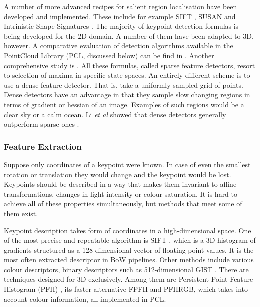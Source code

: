\documentclass[11pt,twoside]{article}
\begin{document}
    A number of more advanced recipes for salient region localisation have been developed and implemented. These include for example SIFT \cite{sift_keypoint}, SUSAN \cite{susan_keypoint} and Intrinistic Shape Signatures \cite{iss_keypoint}. The majority of keypoint detection formulas is being developed for the 2D domain. A number of them have been adapted to 3D, however. A comparative evaluation of detection algorithms available in the PointCloud Library (PCL, discussed below) can be find in \cite{pcl_keypoint_comparision}. Another comprehensive study is \cite{3d_keypoint_eval}. All these formulas, called sparse feature detectors, resort to selection of maxima in specific state spaces. An entirely different scheme is to use a dense feature detector. That is, take a uniformly sampled grid of points. Dense detectors have an advantage in that they sample slow changing regions in terms of gradient or hessian of an image. Examples of such regions would be a clear sky or a calm ocean. Li \emph{et al} showed that dense detectors generally outperform sparse ones \cite{fei2005bayesian}.
    
  \subsubsection{Feature Extraction}
    Suppose only coordinates of a keypoint were known. In case of even the smallest rotation or translation they would change and the keypoint would be lost. Keypoints should be described in a way that makes them invariant to affine transformations, changes in light intensity or colour saturation. It is hard to achieve all of these properties simultaneously, but methods that meet some of them exist.
    
    Keypoint description takes form of coordinates in a high-dimensional space. One of the most precise and repeatable algorithm is SIFT \cite{sift_features}, which is a 3D histogram of gradients structured as a 128-dimensional vector of floating point values. It is the most often extracted descriptor in BoW pipelines. Other methods include various colour descriptors, binary descriptors such as 512-dimensional GIST \cite{ponce2011cv}. There are techniques designed for 3D exclusively. Among them are Persistent Point Feature Histogram (PFH) \cite{pfh_rusu2008}, its faster alternative FPFH \cite{fpfh_rusu2009} and PFHRGB, which takes into account colour information, all implemented in PCL.
    
\end{document}

